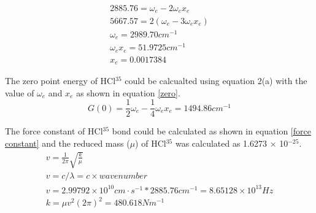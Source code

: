 \documentclass[twocolumn]{article} %
\begin{document}
\begin{subequations}
    \label{omega}
    \begin{gather}
        2885.76 = \omega_e - 2\omega_ex_e \\
        5667.57 = 2(\omega_e - 3\omega_ex_e)\\
        \omega_e = 2989.70 cm^{-1}\\
        \omega_e x_e = 51.9725 cm^{-1}\\
        x_e = 0.0017384
    \end{gather}
\end{subequations}
\vspace{0.1in}


The zero point energy of HCl$^{35}$ could be calcualted using equation 2(a) with the value of $\omega_e$ and $x_e$ as shown in equation \ref{zero}. \\[1\baselineskip]

\begin{equation}
    G(0) = \frac{1}{2}\omega_e - \frac{1}{4}\omega_ex_e = 1494.86 cm^{-1}
    \label{zero}
\end{equation}
\vspace{0.2in}

The force constant of HCl$^{35}$ bond could be calculated as shown in equation \ref{force constant} and the reduced mass ($\mu$) of HCl$^{35}$ was calculated as 1.6273 $\times$ 10$^{-25}$. \\[1\baselineskip]
\begin{subequations}
    \label{force constant}
    \begin{gather}
        v = \frac{1}{2\pi}\sqrt{\frac{k}{\mu}}\\
        v = c / \lambda = c \times wavenumber \\
        v = 2.99792 \times 10^{10} cm \cdot s^{-1} * 2885.76 cm^{-1} = 8.65128 \times 10^{13} Hz\\
        k = \mu v^2 (2\pi)^2 = 480.618 Nm^{-1}
    \end{gather}
\end{subequations}

\vspace{0.2in}
\end{document}
